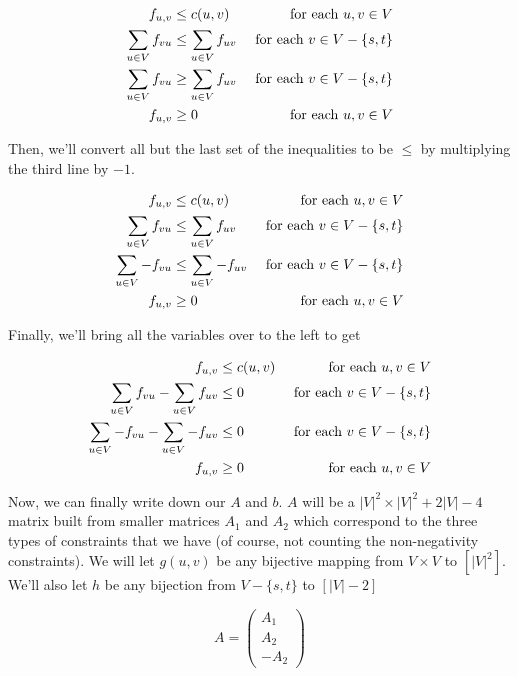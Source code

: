 \documentclass{article}
\begin{document}
\begin{align*}
f_{u,v} &\le c(u,v) &\hbox{ for each $u,v\in V$}\\
\sum_{u\in V} f_{vu} &\le \sum_{u\in V} f_{uv}  &\hbox{ for each $v\in V - \{s,t\}$}\\
\sum_{u\in V} f_{vu} &\ge \sum_{u\in V} f_{uv}  &\hbox{ for each $v\in V - \{s,t\}$}\\
f_{u,v} &\ge 0 &\hbox{ for each $u,v\in V$}\\
\end{align*}

Then, we'll convert all but the last set of the inequalities to be $\le$ by multiplying the third line by $-1$.

\begin{align*}
f_{u,v} &\le c(u,v) &\hbox{ for each $u,v\in V$}\\
\sum_{u\in V} f_{vu} &\le \sum_{u\in V} f_{uv}  &\hbox{ for each $v\in V - \{s,t\}$}\\
\sum_{u\in V} -f_{vu} &\le \sum_{u\in V} -f_{uv}  &\hbox{ for each $v\in V - \{s,t\}$}\\
f_{u,v} &\ge 0 &\hbox{ for each $u,v\in V$}\\
\end{align*}

Finally, we'll bring all the variables over to the left to get

\begin{align*}
f_{u,v} &\le c(u,v) &\hbox{ for each $u,v\in V$}\\
\sum_{u\in V} f_{vu} -\sum_{u\in V} f_{uv}&\le 0  &\hbox{ for each $v\in V - \{s,t\}$}\\
\sum_{u\in V} -f_{vu} - \sum_{u\in V} -f_{uv}&\le 0  &\hbox{ for each $v\in V - \{s,t\}$}\\
f_{u,v} &\ge 0 &\hbox{ for each $u,v\in V$}\\
\end{align*}

Now, we can finally write down our $A$ and $b$. $A$ will be a $|V|^2 \times |V|^2 + 2|V| -4$ matrix built from smaller matrices $A_1$ and $A_2$ which correspond to the three types of constraints that we have (of course, not counting the non-negativity constraints). We will let $g(u,v)$ be any bijective mapping from $V\times V$ to $\left[|V|^2\right]$. We'll also let $h$ be any bijection from $V- \{s,t\}$ to $[|V|-2]$

\[
A = \left(\begin{array}{c}
A_1\\
A_2\\
-A_2
\end{array}\right)
\]
\end{document}

